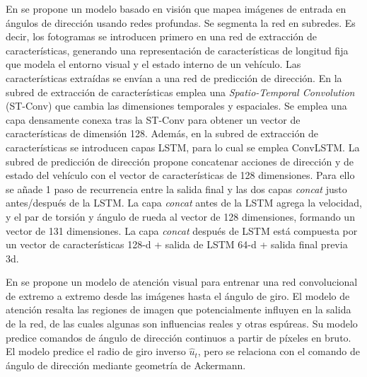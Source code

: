 En \cite{deep-steering} se propone un modelo basado en visión que mapea imágenes de entrada en ángulos de dirección usando redes profundas. Se segmenta la red en subredes. Es decir, los fotogramas se introducen primero en una red de extracción de características, generando una representación de características de longitud fija que modela el entorno visual y el estado interno de un vehículo. Las características extraídas se envían a una red de predicción de dirección. En la subred de extracción de características emplea una \textit{Spatio-Temporal Convolution} (ST-Conv) que cambia las dimensiones temporales y espaciales. Se emplea una capa densamente conexa tras la ST-Conv para obtener un vector de características de dimensión 128. Además, en la subred de extracción de características se introducen capas LSTM, para lo cual se emplea ConvLSTM. La subred de predicción de dirección propone concatenar acciones de dirección y de estado del vehículo con el vector de características de 128 dimensiones. Para ello se añade 1 paso de recurrencia entre la salida final y las dos capas \textit{concat} justo antes/después de la LSTM. La capa \textit{concat} antes de la LSTM agrega la velocidad, y el par de torsión y ángulo de rueda al vector de 128 dimensiones, formando un vector de 131 dimensiones. La capa \textit{concat} después de LSTM está compuesta por un vector de características 128-d + salida de LSTM 64-d + salida final previa 3d.

En \cite{interpretable} se propone un modelo de atención visual para entrenar una red convolucional de extremo a extremo desde las imágenes hasta el ángulo de giro. El modelo de atención resalta las regiones de imagen que potencialmente influyen en la salida de la red, de las cuales algunas son influencias reales y otras espúreas. Su modelo predice comandos de ángulo de dirección continuos a partir de píxeles en bruto. El modelo predice el radio de giro inverso $\hat{u}_t$, pero se relaciona con el comando de ángulo de dirección mediante geometría de Ackermann. 


